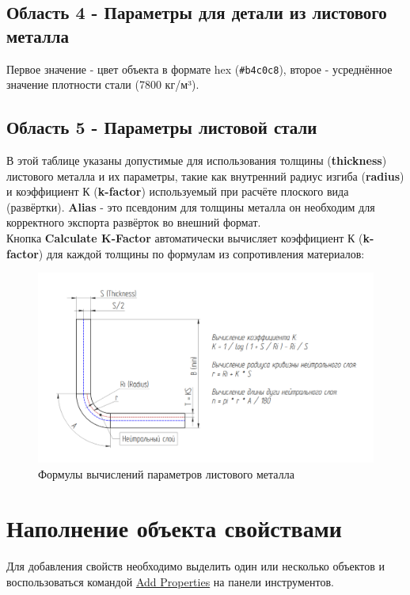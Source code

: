\documentclass[a4paper,12pt]{article}
\begin{document}
\subsection{Область 4 - Параметры для детали из листового металла}
Первое значение - цвет объекта в формате hex (\verb|#b4c0c8|), второе - усреднённое значение плотности стали (7800 кг/м³).

\pagebreak

\subsection{Область 5 - Параметры листовой стали}
В этой таблице указаны допустимые для использования толщины (\textbf{thickness}) листового металла и их параметры, такие как внутренний радиус изгиба (\textbf{radius}) и коэффициент К (\textbf{k-factor}) используемый при расчёте плоского вида (развёртки). \textbf{Alias} - это псевдоним для толщины металла он необходим для корректного экспорта развёрток во внешний формат.\\

Кнопка \textbf{Calculate K-Factor} автоматически вычисляет коэффициент К (\textbf{k-factor}) для каждой толщины по формулам из сопротивления материалов:

\begin{figure}[htp]
\centering
\includegraphics[width=1.0\textwidth]{img/k_ru.png}
\caption{Формулы вычислений параметров листового металла}
\label{sec:k}
\end{figure}

\pagebreak



\section{Наполнение объекта свойствами}
Для добавления свойств необходимо выделить один или несколько объектов и воспользоваться командой \hyperref[sec:5]{Add Properties} на панели инструментов.
\end{document}

